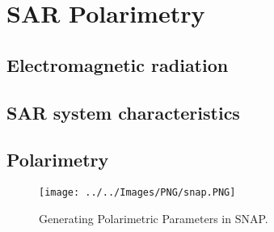\chapter{SAR Polarimetry}\label{chp:obs}%


\section{Electromagnetic radiation}
\section{SAR system characteristics} \label{sec:pr_obs}
\cite{Han2022}
\section{Polarimetry}

	\begin{figure}[H]
    \centering
    \texttt{[image: ../../Images/PNG/snap.PNG]}
    \decoRule
    \caption[Generating Polarimetric Parameters in SNAP]{Generating Polarimetric Parameters in SNAP.}
    \label{fig:undercatch}
\end{figure}

	


